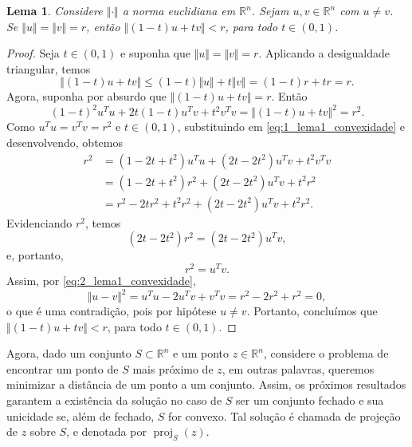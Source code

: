 \documentclass[12pt,a4paper]{scrartcl}
\DeclareMathOperator{\proj}{proj}
\def\RR{\mathds{R}}
\newtheorem{lema}{Lema}
\theoremstyle{definition}%
\begin{document}
\begin{lema} \label{lema:1_convexidade}
Considere $\Vert \cdot \Vert$ a norma euclidiana em $\RR^{n}$. Sejam $u,v \in \RR^{n}$ com $u\neq v$. Se $\Vert u \Vert = \Vert v \Vert = r$, então $\Vert (1-t)u + tv \Vert < r$, para todo $t \in (0,1)$.
\end{lema}

\begin{proof}
Seja $t \in (0,1)$ e suponha que $\Vert u \Vert = \Vert v \Vert = r$. Aplicando a desigualdade triangular, temos
\[
\Vert (1-t)u + tv \Vert \leq (1-t)\Vert u \Vert + t\Vert v \Vert = (1-t)r + tr = r.
\]
Agora, suponha por absurdo que $\Vert (1-t)u + tv \Vert = r$. Então
\[ \label{eq:1_lema1_convexidade}
(1-t)^{2} u^{T}u + 2t(1-t)u^{T}v + t^{2}v^{T}v = \Vert (1-t)u + tv \Vert^{2} = r^{2}.
\]
Como $u^{T}u = v^{T}v = r^{2}$ e $t \in (0,1)$, substituindo em \eqref{eq:1_lema1_convexidade} e desenvolvendo, obtemos 
\begin{align}
r^{2} &= (1-2t+t^{2}) u^{T}u + (2t-2t^{2})u^{T}v + t^{2}v^{T}v \\
&= (1-2t+t^{2}) r^{2} + (2t-2t^{2})u^{T}v + t^{2}r^{2} \\
&= r^{2} - 2tr^{2} + t^{2}r^{2} + (2t-2t^{2})u^{T}v + t^{2}r^{2} .
\end{align}
Evidenciando $r^{2}$, temos
\[ 
(2t-2t^{2})r^{2} = (2t-2t^{2})u^{T}v,
\]
e, portanto,
\[ \label{eq:2_lema1_convexidade}
r^{2} = u^{T}v.
\]
Assim, por \eqref{eq:2_lema1_convexidade},
\[
\Vert u-v \Vert^{2} = u^{T}u - 2u^{T}v + v^{T}v = r^{2} - 2r^{2} + r^{2} = 0,
\]
o que é uma contradição, pois por hipótese $u \neq v$. 
Portanto, concluímos que $\Vert (1-t)u + tv \Vert < r$, para todo $t \in (0,1)$.
\end{proof}

Agora, dado um conjunto $S \subset \RR^{n}$ e um ponto $z \in \RR^{n}$, considere o problema de encontrar um ponto de $S$ mais próximo de $z$, em outras palavras, queremos minimizar a distância de um ponto a um conjunto. Assim, os próximos resultados garantem a existência da solução no caso de $S$ ser um conjunto fechado e sua unicidade se, além de fechado, $S$ for convexo. Tal solução é chamada de projeção de $z$ sobre $S$, e denotada por $\proj_{S} (z)$. 
\end{document}
